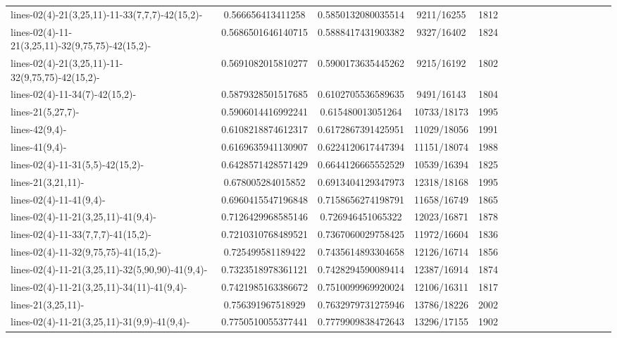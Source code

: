 \documentclass[12pt]{report}			%
\begin{document}
\begin{landscape}
\begin{longtable}{ | p{5cm} | *{15}{c|}}
lines-02(4)-21(3,25,11)-11-33(7,7,7)-42(15,2)-   & 0.566656413411258   & 0.5850132080035514  & 9211/16255  & 1812 \\
lines-02(4)-11-21(3,25,11)-32(9,75,75)-42(15,2)-  & 0.5686501646140715  & 0.5888417431903382  & 9327/16402  & 1824 \\
lines-02(4)-21(3,25,11)-11-32(9,75,75)-42(15,2)-  & 0.5691082015810277  & 0.5900173635445262  & 9215/16192  & 1802 \\
lines-02(4)-11-34(7)-42(15,2)-                    & 0.5879328501517685  & 0.6102705536589635  & 9491/16143  & 1804 \\
lines-21(5,27,7)-                                 & 0.5906014416992241  & 0.615480013051264   & 10733/18173 & 1995 \\
lines-42(9,4)-                                    & 0.6108218874612317  & 0.6172867391425951  & 11029/18056 & 1991 \\
lines-41(9,4)-                                    & 0.6169635941130907  & 0.6224120617447394  & 11151/18074 & 1988 \\
lines-02(4)-11-31(5,5)-42(15,2)-                  & 0.6428571428571429  & 0.6644126665552529  & 10539/16394 & 1825 \\
lines-21(3,21,11)-                                & 0.678005284015852   & 0.6913404129347973  & 12318/18168 & 1995 \\
lines-02(4)-11-41(9,4)-                           & 0.6960415547196848  & 0.7158656274198791  & 11658/16749 & 1865 \\
lines-02(4)-11-21(3,25,11)-41(9,4)-               & 0.7126429968585146  & 0.726946451065322   & 12023/16871 & 1878 \\
lines-02(4)-11-33(7,7,7)-41(15,2)-               & 0.7210310768489521  & 0.7367060029758425  & 11972/16604 & 1836 \\
lines-02(4)-11-32(9,75,75)-41(15,2)-              & 0.725499581189422   & 0.7435614893304658  & 12126/16714 & 1856 \\
lines-02(4)-11-21(3,25,11)-32(5,90,90)-41(9,4)-   & 0.7323518978361121  & 0.7428294590089414  & 12387/16914 & 1874 \\
lines-02(4)-11-21(3,25,11)-34(11)-41(9,4)-        & 0.7421985163386672  & 0.7510099969920024  & 12106/16311 & 1817 \\
lines-21(3,25,11)-                                & 0.756391967518929   & 0.7632979731275946  & 13786/18226 & 2002 \\
lines-02(4)-11-21(3,25,11)-31(9,9)-41(9,4)-       & 0.7750510055377441  & 0.7779909838472643  & 13296/17155 & 1902 \\

\end{longtable}
\end{landscape}
\end{document}
